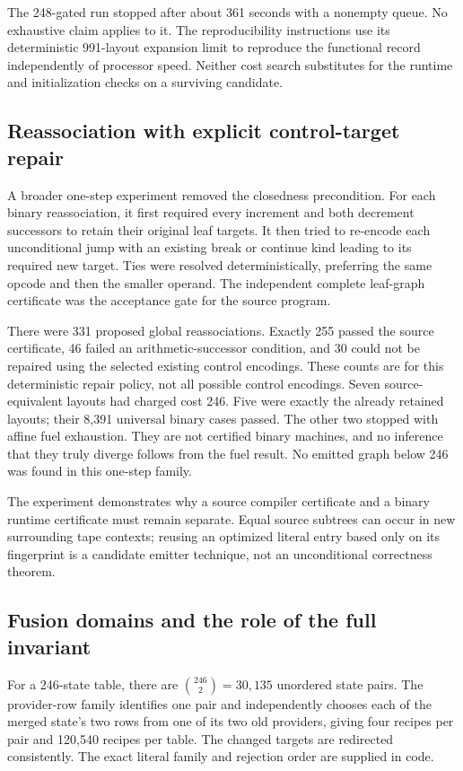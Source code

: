 The 248-gated run stopped after about 361 seconds with a nonempty queue.
No exhaustive claim applies to it. The reproducibility instructions use
its deterministic 991-layout expansion limit to reproduce the functional
record independently of processor speed. Neither cost search substitutes
for the runtime and initialization checks on a surviving candidate.

\subsection{Reassociation with explicit control-target repair}

A broader one-step experiment removed the closedness precondition.
For each binary reassociation, it first required every increment and
both decrement successors to retain their original leaf targets. It
then tried to re-encode each unconditional jump with an existing break
or continue kind leading to its required new target. Ties were resolved
deterministically, preferring the same opcode and then the smaller
operand. The independent complete leaf-graph certificate was the
acceptance gate for the source program.

There were 331 proposed global reassociations. Exactly 255 passed the
source certificate, 46 failed an arithmetic-successor condition, and
30 could not be repaired using the selected existing control encodings.
These counts are for this deterministic repair policy, not all possible
control encodings. Seven source-equivalent layouts had charged cost
246. Five were exactly the already retained layouts; their 8,391
universal binary cases passed. The other two stopped with affine fuel
exhaustion. They are not certified binary machines, and no inference
that they truly diverge follows from the fuel result. No emitted graph
below 246 was found in this one-step family.

The experiment demonstrates why a source compiler certificate and a
binary runtime certificate must remain separate. Equal source subtrees
can occur in new surrounding tape contexts; reusing an optimized literal
entry based only on its fingerprint is a candidate emitter technique,
not an unconditional correctness theorem.

\subsection{Fusion domains and the role of the full invariant}

For a 246-state table, there are $\binom{246}{2}=30,135$ unordered state
pairs. The provider-row family identifies one pair and independently
chooses each of the merged state's two rows from one of its two old
providers, giving four recipes per pair and 120,540 recipes per table.
The changed targets are redirected consistently. The exact literal
family and rejection order are supplied in code.

